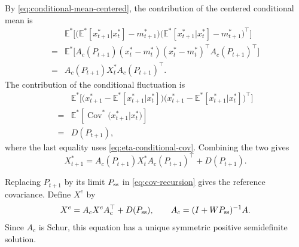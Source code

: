 \documentclass[10pt,journal,twoside]{IEEEtran}
\theoremstyle{definition}
\theoremstyle{remark}
\begin{document}

By \eqref{eq:conditional-mean-centered}, the contribution of the centered
conditional mean is
\[
\begin{aligned}
	&\mathbb E^*\Big[\big(\mathbb E^*[x_{t+1}^*\big|x_t^*]-m_{t+1}^*\big)\big(\mathbb E^*[x_{t+1}^*\big|x_t^*]-m_{t+1}^*\big)^\top\Big] \\
	=&\mathbb E^*\Big[A_c(P_{t+1})(x_t^*-m_t^*) (x_t^*-m_t^*)^\top A_c(P_{t+1})^\top\Big] \\
	=&A_c(P_{t+1})X_t^*A_c(P_{t+1})^\top .
\end{aligned}
\]
The contribution of the conditional fluctuation is
\[
\begin{aligned}
	&\mathbb E^*
	\Big[\big(x_{t+1}^*-\mathbb E^*[x_{t+1}^*\big|x_t^*]\big)
	\big(x_{t+1}^*-	\mathbb E^*[x_{t+1}^*\big|x_t^*]\big)^\top\Big] \\
	=&\mathbb E^*\left[\operatorname{Cov}^{*}\big(x_{t+1}^*\big|x_t^*\big)\right] \\
	=&D(P_{t+1}),
\end{aligned}
\]
where the last equality uses \eqref{eq:eta-conditional-cov}. Combining the two gives
\begin{equation}
	X_{t+1}^*
	=
	A_c(P_{t+1})
	X_t^*
	A_c(P_{t+1})^\top
	+
	D(P_{t+1}).
	\label{eq:cov-recursion}
\end{equation}


Replacing \(P_{t+1}\) by its limit \(P_{\rm ss}\) in \eqref{eq:cov-recursion} gives the reference covariance.  Define \(X^e\) by
\begin{equation}
	X^e
	=
	A_cX^eA_c^\top+D(P_{\rm ss}),
	\qquad
	A_c=(I+WP_{\rm ss})^{-1}A .
	\label{eq:Xe-Lyapunov}
\end{equation}
Since \(A_c\) is Schur, this equation has a unique symmetric positive semidefinite solution.
\end{document}
